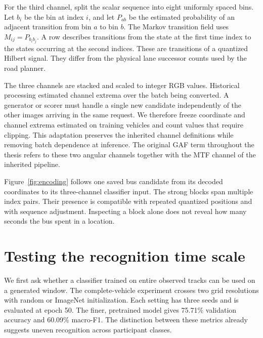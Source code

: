 For the third channel, split the scalar sequence into eight uniformly spaced bins. Let $b_i$ be the bin at index $i$, and let $P_{ab}$ be the estimated probability of an adjacent transition from bin $a$ to bin $b$. The Markov transition field uses $M_{ij}=P_{b_i b_j}$. A row describes transitions from the state at the first time index to the states occurring at the second indices. These are transitions of a quantized Hilbert signal. They differ from the physical lane successor counts used by the road planner.

The three channels are stacked and scaled to integer RGB values. Historical processing estimated channel extrema over the batch being converted. A generator or scorer must handle a single new candidate independently of the other images arriving in the same request. We therefore freeze coordinate and channel extrema estimated on training vehicles and count values that require clipping. This adaptation preserves the inherited channel definitions while removing batch dependence at inference. The original GAF term throughout the thesis refers to these two angular channels together with the MTF channel of the inherited pipeline.

Figure~\ref{fig:encoding} follows one saved bus candidate from its decoded coordinates to its three-channel classifier input. The strong blocks span multiple index pairs. Their presence is compatible with repeated quantized positions and with sequence adjustment. Inspecting a block alone does not reveal how many seconds the bus spent in a location.


\section{Testing the recognition time scale}
We first ask whether a classifier trained on entire observed tracks can be used on a generated window. The complete-vehicle experiment crosses two grid resolutions with random or ImageNet initialization. Each setting has three seeds and is evaluated at epoch 50. The finer, pretrained model gives 75.71\% validation accuracy and 60.09\% macro-F1. The distinction between these metrics already suggests uneven recognition across participant classes.

